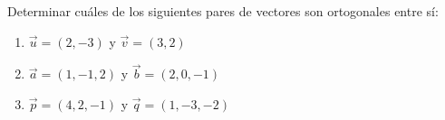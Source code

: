 Determinar cuáles de los siguientes pares de vectores son ortogonales entre sí:
\begin{enumerate}
    \item $\vec{u} = (2, -3)$ y $\vec{v} = (3, 2)$
    \item $\vec{a} = (1, -1, 2)$ y $\vec{b} = (2, 0, -1)$
    \item $\vec{p} = (4, 2, -1)$ y $\vec{q} = (1, -3, -2)$
\end{enumerate}